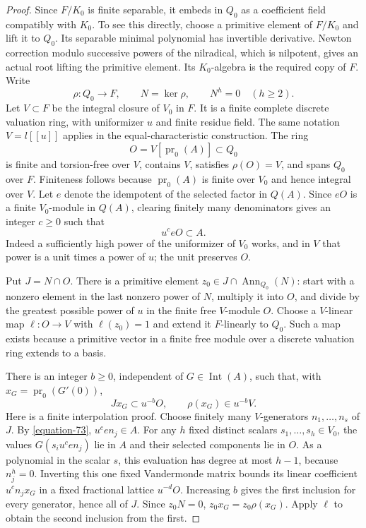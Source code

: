 \documentclass[11pt,a4paper]{article}
\theoremstyle{definition}
\begin{document}
\begin{proof}
Since $F/K_0$ is finite separable, it embeds in $Q_0$ as
a coefficient field compatibly with $K_0$. To see this
directly, choose a primitive element of $F/K_0$ and lift
it to $Q_0$. Its separable minimal polynomial has invertible
derivative. Newton correction modulo successive powers of
the nilradical, which is nilpotent, gives an actual root
lifting the primitive element. Its $K_0$-algebra is the
required copy of $F$. Write
\[
 \rho:Q_0\longrightarrow F,\qquad N=\ker\rho,
 \qquad N^h=0\quad(h\ge2).
\]
Let $V\subset F$ be the integral closure of $V_0$ in $F$.
It is a finite complete discrete valuation ring, with
uniformizer $u$ and finite residue field. The same notation
$V=l[[u]]$ applies in the equal-characteristic construction.
The ring
\[
 O=V[\operatorname{pr}_0(A)]\subset Q_0
\]
is finite and torsion-free over $V$, contains $V$, satisfies
$\rho(O)=V$, and spans $Q_0$ over $F$.
Finiteness follows because $\operatorname{pr}_0(A)$ is
finite over $V_0$ and hence integral over $V$.
Let $e$ denote the idempotent of the selected factor in
$Q(A)$. Since $eO$ is a finite $V_0$-module in $Q(A)$,
clearing finitely many denominators gives an integer $c\ge0$
such that
\begin{equation}
                         u^c eO\subset A.                 \label{equation-73}
\end{equation}
Indeed a sufficiently high power of the uniformizer of
$V_0$ works, and in $V$ that power is a unit times a
power of $u$; the unit preserves $O$.

Put $J=N\cap O$. There is a primitive element
$z_0\in J\cap\operatorname{Ann}_{Q_0}(N)$: start with a
nonzero element in the last nonzero power of $N$, multiply
it into $O$, and divide by the greatest possible power of
$u$ in the finite free $V$-module $O$. Choose a
$V$-linear map $\ell:O\to V$ with $\ell(z_0)=1$ and
extend it $F$-linearly to $Q_0$. Such a map exists because
a primitive vector in a finite free module over a discrete
valuation ring extends to a basis.

There is an integer $b\ge0$, independent of
$G\in\operatorname{Int}(A)$, such that, with
$x_G=\operatorname{pr}_0(G'(0))$,
\begin{equation}
                  Jx_G\subset u^{-b}O,\qquad
                  \rho(x_G)\in u^{-b}V.                   \label{equation-74}
\end{equation}
Here is a finite interpolation proof. Choose finitely many
$V$-generators $n_1,\ldots,n_s$ of $J$. By \eqref{equation-73},
$u^c e n_j\in A$. For any $h$ fixed distinct scalars
$s_1,\ldots,s_h\in V_0$, the values
$G(s_i u^c e n_j)$ lie in $A$ and their selected components
lie in $O$. As a polynomial in the scalar $s$, this
evaluation has degree at most $h-1$, because $n_j^h=0$.
Inverting this one fixed Vandermonde matrix bounds its
linear coefficient $u^c n_jx_G$ in a fixed fractional
lattice $u^{-d}O$. Increasing $b$ gives the first inclusion
for every generator, hence all of $J$. Since $z_0N=0$,
$z_0x_G=z_0\rho(x_G)$. Apply $\ell$ to obtain the second
inclusion from the first.


\end{proof}
\end{document}
